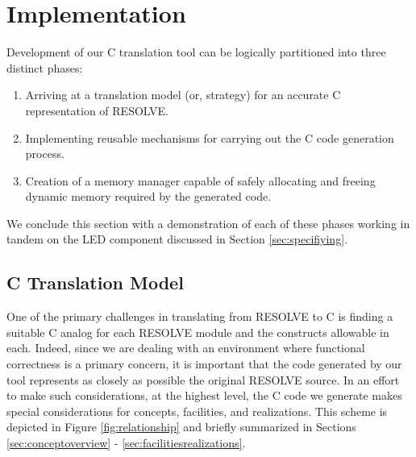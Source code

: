 \section{Implementation}
Development of our C translation tool can be logically partitioned into three distinct phases: 
\begin{enumerate}
\item Arriving at a translation model (or, strategy) for an accurate C representation of RESOLVE.
\item Implementing reusable mechanisms for carrying out the C code generation process.
\item Creation of a memory manager capable of safely allocating and freeing dynamic memory required by the generated code.
\end{enumerate}
We conclude this section with a demonstration of each of these phases working in tandem on the LED component discussed in Section \ref{sec:specifiying}. 

\subsection{C Translation Model}
One of the primary challenges in translating from RESOLVE to C is finding a suitable C analog for each RESOLVE module and the constructs allowable in each. Indeed, since we are dealing with an environment where functional correctness is a primary concern, it is important that the code generated by our tool represents as closely as possible the original RESOLVE source. In an effort to make such considerations, at the highest level, the C code we generate makes special considerations for concepts, facilities, and realizations. This scheme is depicted in Figure \ref{fig:relationship} and briefly summarized in Sections \ref{sec:conceptoverview} - \ref{sec:facilitiesrealizations}.

